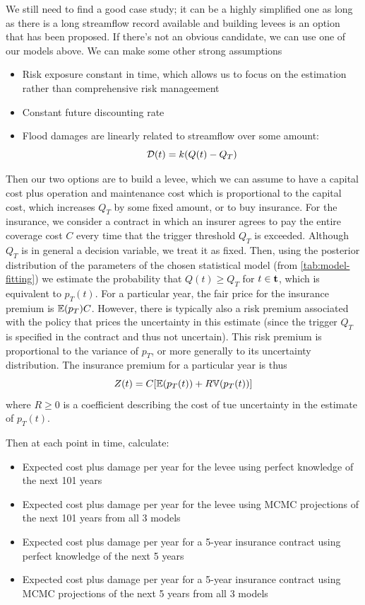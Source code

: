\documentclass[12pt]{article}
\begin{document}
We still need to find a good case study; it can be a highly simplified one as long as there is a long streamflow record available and building levees is an option that has been proposed.
If there's not an obvious candidate, we can use one of our models above.
We can make some other strong assumptions
\begin{itemize}
  \item Risk exposure constant in time, which allows us to focus on the estimation rather than comprehensive risk manageement
  \item Constant future discounting rate
  \item Flood damages are linearly related to streamflow over some amount:
  \begin{equation}
    \mathcal{D}(t) = k \qty( Q(t) - Q_T)
  \end{equation}
\end{itemize}
Then our two options are to build a levee, which we can assume to have a capital cost plus operation and maintenance cost which is proportional to the capital cost, which increases \(Q_T\) by some fixed amount, or to buy insurance.
For the insurance, we consider a contract in which an insurer agrees to pay the entire coverage cost \(C\) every time that the trigger threshold \(Q_T\) is exceeded.
Although \(Q_T\) is in general a decision variable, we treat it as fixed.
Then, using the posterior distribution of the parameters of the chosen statistical model (from \cref{tab:model-fitting}) we estimate the probability that \(Q(t) \geq Q_T\) for \(t \in \vb{t}\), which is equivalent to \(p_T(t)\).
For a particular year, the fair price for the insurance premium is \(\mathbb{E} \qty(p_T) C\).
However, there is typically also a risk premium associated with the policy that prices the uncertainty in this estimate (since the trigger \(Q_T\) is specified in the contract and thus not uncertain).
This risk premium is proportional to the variance of \(p_T\), or more generally to its uncertainty distribution.
The insurance premium for a particular year is thus
\begin{equation} \label{eq:premium}
  Z(t) = C \qty[\mathbb{E} \qty(p_T(t)) + R \mathbb{V} \qty(p_T(t))]
\end{equation}
where \(R \geq 0\) is a coefficient describing the cost of tue uncertainty in the estimate of \(p_T(t)\).

Then at each point in time, calculate:
\begin{itemize}
  \item Expected cost plus damage per year for the levee using perfect knowledge of the next 101 years
  \item Expected cost plus damage per year for the levee using MCMC projections of the next 101 years from all 3 models
  \item Expected cost plus damage per year for a 5-year insurance contract using perfect knowledge of the next 5 years
  \item Expected cost plus damage per year for a 5-year insurance contract using MCMC projections of the next 5 years from all 3 models
\end{itemize}
\end{document}
